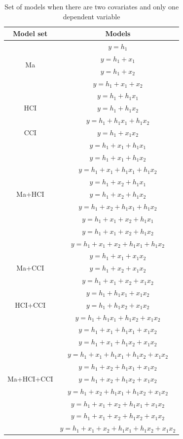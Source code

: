 \begin{table}[]
\caption{}
\caption*{\footnotesize Set of models when there are two covariates and only one dependent variable}
\centering
\begin{tabular}{cc}
\toprule
Model set & Models \\ 
\midrule
\multirow{4}{*}{Ma} & $y=h_1$ \\ & $y=h_1+x_1$ \\ & $y=h_1+x_2$ \\ & $y=h_1+x_1+x_2$ & \\ 
\multirow{3}{*}{HCI} & $y=h_1+h_1x_1$ \\ & $y=h_1+h_1x_2$ \\ & $y=h_1+h_1x_1+h_1x_2$ & \\
CCI & $y=h_1+x_1x_2$ & \\ 
\multirow{9}{*}{Ma+HCI} & $y=h_1+x_1+h_1x_1$\\ & $y=h_1+x_1+h_1x_2$\\ & $y=h_1+x_1+h_1x_1+h_1x_2$\\ & $y=h_1+x_2+h_1x_1$\\ & $y=h_1+x_2+h_1x_2$\\ & $y=h_1+x_2+h_1x_1+h_1x_2$\\ & $y=h_1+x_1+x_2+h_1x_1$\\ & $y=h_1+x_1+x_2+h_1x_2$\\ & $y=h_1+x_1+x_2+h_1x_1+h_1x_2$ & \\ 
\multirow{3}{*}{Ma+CCI} & $y=h_1+x_1+x_1x_2$\\ & $y=h_1+x_2+x_1x_2$\\ & $y=h_1+x_1+x_2+x_1x_2$ & \\
\multirow{3}{*}{HCI+CCI} & $y=h_1+h_1x_1+x_1x_2$\\ & $y=h_1+h_1x_2+x_1x_2$\\ & $y=h_1+h_1x_1+h_1x_2+x_1x_2$ & \\
\multirow{9}{*}{Ma+HCI+CCI} & $y=h_1+x_1+h_1x_1+x_1x_2$\\ & $y=h_1+x_1+h_1x_2+x_1x_2$\\ & $y=h_1+x_1+h_1x_1+h_1x_2+x_1x_2$\\ & $y=h_1+x_2+h_1x_1+x_1x_2$\\ & $y=h_1+x_2+h_1x_2+x_1x_2$\\ & $y=h_1+x_2+h_1x_1+h_1x_2+x_1x_2$\\ & $y=h_1+x_1+x_2+h_1x_1+x_1x_2$\\ & $y=h_1+x_1+x_2+h_1x_2+x_1x_2$\\ & $y=h_1+x_1+x_2+h_1x_1+h_1x_2+x_1x_2$ \\ 
\bottomrule
\end{tabular}
\end{table}



